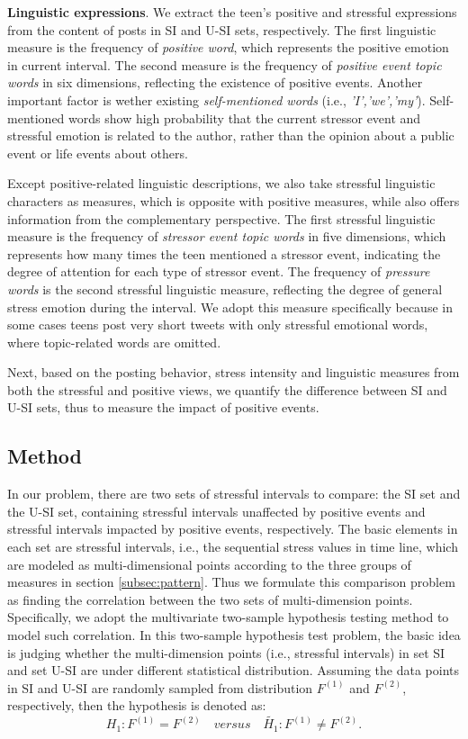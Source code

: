 \textbf{Linguistic expressions}.
We extract the teen's positive and stressful expressions from the content of posts in SI and U-SI sets, respectively.
The first linguistic measure is the frequency of \emph{positive word},
which represents the positive emotion in current interval.
The second measure is the frequency of \emph{positive event topic words} in six dimensions,
reflecting the existence of positive events.
Another important factor is wether existing \emph{self-mentioned words} (i.e., \emph{'I','we','my'}).
Self-mentioned words show high probability that the current stressor event and stressful emotion is related to the author,
rather than the opinion about a public event or life events about others.

Except positive-related linguistic descriptions, we also take stressful linguistic characters as measures,
which is opposite with positive measures, while also offers information from the complementary perspective.
The first stressful linguistic measure is the frequency of \emph{stressor event topic words} in five dimensions,
which represents how many times the teen mentioned a stressor event,
indicating the degree of attention for each type of stressor event.
The frequency of \emph{pressure words} is the second stressful linguistic measure,
reflecting the degree of general stress emotion during the interval.
We adopt this measure specifically because in some cases teens post very short tweets with only stressful emotional words,
where topic-related words are omitted.

Next,
based on the posting behavior, stress intensity and linguistic measures from both the stressful and positive views,
we quantify the difference between SI and U-SI sets, thus to measure the impact of positive events.

\subsection{Method}
In our problem,
there are two sets of stressful intervals to compare:
the SI set and the U-SI set,
containing stressful intervals unaffected by positive events
and stressful intervals impacted by positive events, respectively.
The basic elements in each set are stressful intervals,
i.e., the sequential stress values in time line,
which are modeled as multi-dimensional points according to the three groups of measures in section \ref{subsec:pattern}.
Thus we formulate this comparison problem as finding the correlation between the two sets of multi-dimension points.
Specifically, we adopt the multivariate two-sample hypothesis testing method
\cite{Li2017Correlating,Johnson2012Applied} to model such correlation.
In this two-sample hypothesis test problem,
the basic idea is judging whether the multi-dimension points (i.e., stressful intervals)
in set SI and set U-SI are under different statistical distribution.
Assuming the data points in SI and U-SI are randomly sampled from distribution $F^{(1)}$ and $F^{(2)}$, respectively,
then the hypothesis is denoted as:
\begin{equation}
H_1: F^{(1)} =F^{(2)} \quad versus \quad \widetilde{H_1}: F^{(1)} \neq F^{(2)}.
\end{equation}

